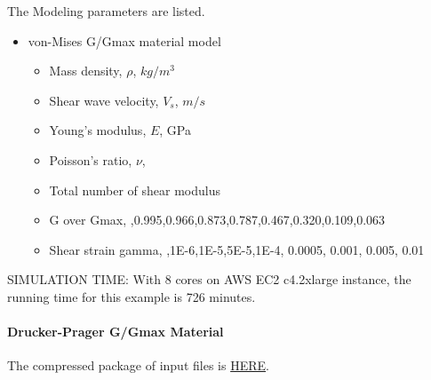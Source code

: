 The Modeling parameters are listed.
\begin{itemize}
  \item von-Mises G/Gmax material model 
  \begin{itemize}
    \item Mass density, $\rho$, \enspace {} $kg/m^3$
    \item Shear wave velocity, $V_s$, \enspace {} $m/s$
    \item Young's modulus, $E$, \enspace {} GPa
    \item Poisson's ratio, $\nu$, \enspace {}
    \item Total number of shear modulus \enspace {}
    \item G over Gmax, \enspace {},0.995,0.966,0.873,0.787,0.467,0.320,0.109,0.063
    \item Shear strain gamma, \enspace {},1E-6,1E-5,5E-5,1E-4, 0.0005, 0.001, 0.005, 0.01
  \end{itemize}
\end{itemize}

SIMULATION TIME: With 8 cores on AWS EC2 c4.2xlarge instance, the running time for this example is 726 minutes.


\paragraph{Drucker-Prager G/Gmax Material}
The compressed package of input files is  
\href{http://sokocalo.engr.ucdavis.edu/~jeremic/Real_ESSI_Simulator/Real_ESSI_Short_Course_Examples_Dec2017/short-course-examples/nonlinear_analysis_steps/soil-foundation/DruckerPragerGoverGmax/_all_files_packaged_for_DruckerPragerGoverGmax.tar.gz}{HERE}. 


